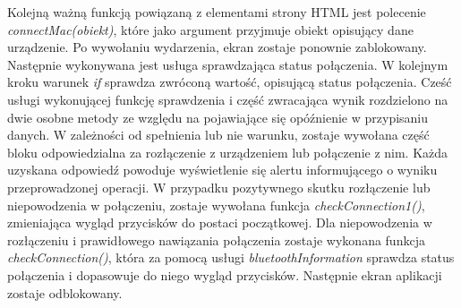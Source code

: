 Kolejną ważną funkcją powiązaną z elementami strony HTML jest polecenie \textit{connectMac(obiekt)}, które jako argument przyjmuje obiekt opisujący dane urządzenie. Po wywołaniu wydarzenia, ekran zostaje ponownie zablokowany. Następnie wykonywana jest usługa sprawdzająca status połączenia. W kolejnym kroku warunek \textit{if} sprawdza zwróconą wartość, opisującą status połączenia. Cześć usługi wykonującej funkcję sprawdzenia i część zwracająca wynik rozdzielono na dwie osobne metody ze względu na pojawiające się opóźnienie w przypisaniu danych. W zależności od spełnienia lub nie warunku, zostaje wywołana część bloku odpowiedzialna za rozłączenie z urządzeniem lub połączenie z nim. Każda uzyskana odpowiedź powoduje wyświetlenie się alertu informującego o wyniku przeprowadzonej operacji. W przypadku pozytywnego skutku rozłączenie lub niepowodzenia w połączeniu, zostaje wywołana funkcja \textit{checkConnection1()}, zmieniająca wygląd przycisków do postaci początkowej. Dla niepowodzenia w rozłączeniu i prawidłowego nawiązania połączenia zostaje wykonana funkcja \textit{checkConnection()}, która za pomocą usługi \textit{bluetoothInformation} sprawdza status połączenia i dopasowuje do niego wygląd przycisków. Następnie ekran aplikacji zostaje odblokowany.

